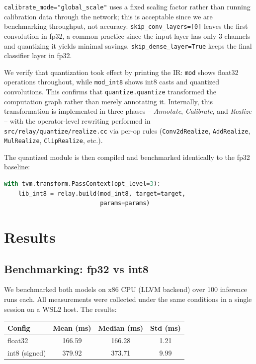\documentclass[11pt,a4paper]{article}
\begin{document}
\texttt{calibrate\_mode="global\_scale"} uses a fixed scaling factor rather than running calibration data through the network; this is acceptable since we are benchmarking throughput, not accuracy. \texttt{skip\_conv\_layers=[0]} leaves the first convolution in fp32, a common practice since the input layer has only 3 channels and quantizing it yields minimal savings. \texttt{skip\_dense\_layer=True} keeps the final classifier layer in fp32.

We verify that quantization took effect by printing the IR: \texttt{mod} shows float32 operations throughout, while \texttt{mod\_int8} shows int8 casts and quantized convolutions. This confirms that \texttt{quantize.quantize} transformed the computation graph rather than merely annotating it. Internally, this transformation is implemented in three phases -- \emph{Annotate}, \emph{Calibrate}, and \emph{Realize} -- with the operator-level rewriting performed in \texttt{src/relay/quantize/realize.cc} via per-op rules (\texttt{Conv2dRealize}, \texttt{AddRealize}, \texttt{MulRealize}, \texttt{ClipRealize}, etc.).

The quantized module is then compiled and benchmarked identically to the fp32 baseline:

\begin{lstlisting}[language=Python]
with tvm.transform.PassContext(opt_level=3):
    lib_int8 = relay.build(mod_int8, target=target,
                           params=params)
\end{lstlisting}


\section{Results}

\subsection{Benchmarking: fp32 vs int8}

We benchmarked both models on x86 CPU (LLVM backend) over 100 inference runs each. All measurements were collected under the same conditions in a single session on a WSL2 host. The results:

\begin{table}[h]
\centering
\begin{tabular}{lccc}
\toprule
\textbf{Config} & \textbf{Mean (ms)} & \textbf{Median (ms)} & \textbf{Std (ms)} \\
\midrule
float32          & 166.59  & 166.28  & 1.21 \\
int8 (signed)    & 379.92  & 373.71  & 9.99 \\
\bottomrule
\end{tabular}
\end{table}
\end{document}
